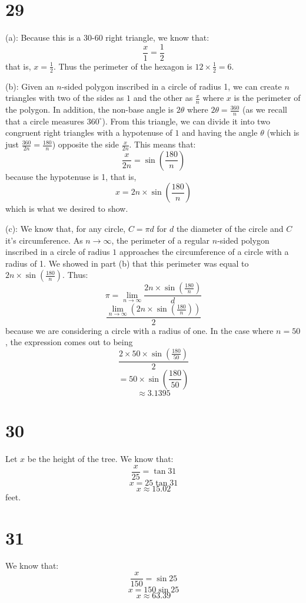 \documentclass{article}
\theoremstyle{definition}
\newcommand{\?}{\stackrel{?}{=}}
\begin{document}
\section*{29}
(a): Because this is a 30-60 right triangle, we know that:
\[ \frac{x}{1}=\frac{1}{2} \] that is, $x=\frac{1}{2}$. Thus the perimeter of the hexagon is $12\times\frac{1}{2}=6$.


(b): Given an $n$-sided polygon inscribed in a circle of radius 1, we can create $n$ triangles with two of the sides as $1$ and the other as $\frac{x}{n}$ where $x$ is the perimeter of the 
polygon. In addition, the non-base angle is $2\theta$ where $2\theta=\frac{360}{n}$ (as we recall that a circle measures $360^\circ$). From this triangle, we can divide it into two congruent 
right triangles with a hypotenuse of $1$ and having the angle $\theta$ (which is just $\frac{360}{2n}=\frac{180}{n}$) opposite the side $\frac{x}{2n}$. This means that:
\[ \frac{x}{2n}=\sin\left(\frac{180}{n}\right) \] because the hypotenuse is 1, that is, 
\[ x=2n\times\sin\left(\frac{180}{n}\right) \] which is what we desired to show.


(c): We know that, for any circle, $C=\pi d$ for $d$ the diameter of the circle and $C$ it's circumference. As $n\rightarrow\infty$, the perimeter of a regular $n$-sided polygon 
inscribed in a circle of radius $1$ approaches the circumference of a circle with a radius of 1. We showed in part (b) that this perimeter was equal to 
$2n\times\sin\left(\frac{180}{n}\right)$. Thus:
\[ \pi=\lim_{n\rightarrow\infty}\dfrac{2n\times\sin\left(\frac{180}{n}\right)}{d} \]
\[ \dfrac{\lim_{n\rightarrow\infty}\left(2n\times\sin\left(\frac{180}{n}\right)\right)}{2} \] because we are considering a circle with a radius of one. 
In the case where $n=50$, the expression comes out to being
\[ \dfrac{2\times 50\times\sin\left(\frac{180}{50}\right)}{2} \]
\[ =50\times\sin\left(\frac{180}{50}\right) \]
\[ \approx 3.1395 \]

\section*{30}
Let $x$ be the height of the tree. We know that:
\[ \frac{x}{25}=\tan 31 \]
\[ x=25\tan 31 \]
\[ x\approx 15.02 \] feet.

\section*{31}
We know that:
\[ \frac{x}{150}=\sin 25 \]
\[ x=150\sin 25 \]
\[ x\approx 63.39 \]
\end{document}
